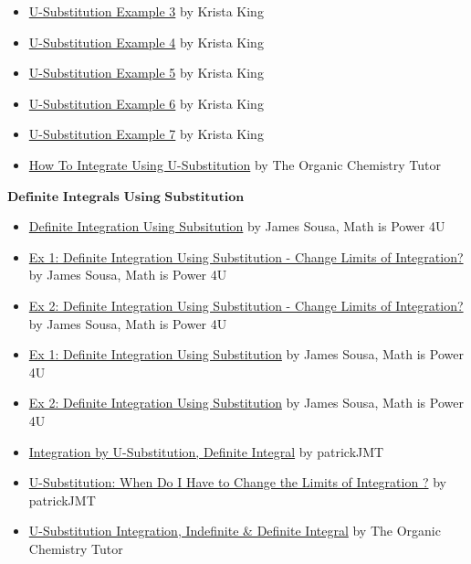 \begin{itemize}
    \item \href{https://youtu.be/w1FHS-XV64Q}{U-Substitution Example 3} by Krista King
    \item \href{https://youtu.be/_r6xMeO7aEw}{U-Substitution Example 4} by Krista King
    \item \href{https://youtu.be/gIj3objG09Q}{U-Substitution Example 5} by Krista King
    \item \href{https://youtu.be/TlUW6ZenNXY}{U-Substitution Example 6} by Krista King
    \item \href{https://youtu.be/W1WVFJ8iMqQ}{U-Substitution Example 7} by Krista King
    \item \href{https://youtu.be/IAh00vU3FSY}{How To Integrate Using U-Substitution} by The Organic Chemistry Tutor
\end{itemize}

$\textbf{Definite Integrals Using Substitution}$


\begin{itemize}
    \item \href{https://www.youtube.com/watch?v=hjr27pv8pHQ}{Definite Integration Using Subsitution} by James Sousa, Math is Power 4U
    \item \href{https://www.youtube.com/watch?v=jUwNl_PDeDY}{Ex 1: Definite Integration Using Substitution - Change Limits of Integration?} by James Sousa, Math is Power 4U
    \item \href{https://www.youtube.com/watch?v=n3DGt7cnS70}{Ex 2: Definite Integration Using Substitution - Change Limits of Integration?} by James Sousa, Math is Power 4U
    \item \href{https://www.youtube.com/watch?v=8ofGv7TQL34}{Ex 1: Definite Integration Using Substitution} by James Sousa, Math is Power 4U
    \item \href{https://www.youtube.com/watch?v=M-IUhe-iQx0}{Ex 2: Definite Integration Using Substitution} by James Sousa, Math is Power 4U
    \item \href{https://youtu.be/3XOzg2-DdTA}{Integration by U-Substitution, Definite Integral} by patrickJMT
    \item \href{https://youtu.be/FJoyIAIC1Ag}{U-Substitution: When Do I Have to Change the Limits of Integration ?} by patrickJMT
    \item \href{https://youtu.be/0A2RlnutO8U}{U-Substitution Integration, Indefinite \& Definite Integral} by The Organic Chemistry Tutor
\end{itemize}


